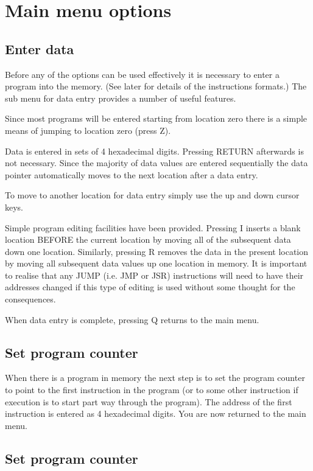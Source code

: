 \documentclass{article}
\begin{document}
\section{Main menu options}

\subsection{Enter data}

Before any of the options can be used effectively it is necessary to enter a program into the memory. (See later for details of the instructions formats.) The sub menu for data entry provides a number of useful features.

Since most programs will be entered starting from location zero there is a simple means of jumping to location zero (press Z).

Data is entered in sets of 4 hexadecimal digits. Pressing RETURN afterwards is not necessary. Since the majority of data values are entered sequentially the data pointer automatically moves to the next location after a data entry.

To move to another location for data entry simply use the up and down cursor keys.

Simple program editing facilities have been provided. Pressing I inserts a blank location BEFORE the current location by moving all of the subsequent data down one location. Similarly, pressing R removes the data in the present location by moving all subsequent data values up one location in memory. It is important to realise that any JUMP (i.e. JMP or JSR) instructions will need to have their addresses changed if this type of editing is used without some thought for the consequences.

When data entry is complete, pressing Q returns to the main menu.

\subsection{Set program counter}

When there is a program in memory the next step is to set the program counter to point to the first instruction in the program (or to some other instruction if execution is to start part way through the program). The address of the first instruction is entered as 4 hexadecimal digits. You are now returned to the main menu.

\subsection{Set program counter}
\end{document}
